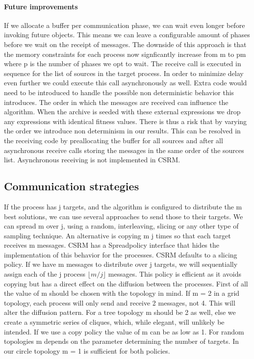 \paragraph{Future improvements}
If we allocate a buffer per communication phase, we can wait even longer before invoking future objects. This means we can leave a configurable amount of phases before we wait on the receipt of messages. The downside of this approach is that the memory constraints for each process now signficantly increase from m to pm where p is the number of phases we opt to wait.
The receive call is executed in sequence for the list of sources in the target process. In order to minimize delay even further we could execute this call asynchronously as well. Extra code would need to be introduced to handle the possible non deterministic behavior this introduces. The order in which the messages are received can influence the algorithm. When the archive is seeded with these external expressions we drop any expressions with identical fitness values. There is thus a risk that by varying the order we introduce non determinism in our results. This can be resolved in the receiving code by preallocating the buffer for all sources and after all asynchronous receive calls storing the messages in the same order of the sources list. 
Asynchronous receiving is not implemented in CSRM.
\subsection{Communication strategies}
If the process has j targets, and the algorithm is configured to distribute the m best solutions, we can use several approaches to send those to their targets. We can spread m over j, using a random, interleaving, slicing or any other type of sampling technique. An alternative is copying m j times so that each target receives m messages.
CSRM has a Spreadpolicy interface that hides the implementation of this behavior for the processes. CSRM defaults to a slicing policy. If we have m messages to distribute over j targets, we will sequentially assign each of the j process $ \lfloor{m/j}\rfloor $ messages.
This policy is efficient as it avoids copying but has a direct effect on the diffusion between the processes. First of all the value of m should be chosen with the topology in mind. If m = 2 in a grid topology, each process will only send and receive 2 messages, not 4. This will alter the diffusion pattern. For a tree topology m should be 2 as well, else we create a symmetric series of cliques, which, while elegant, will unlikely be intended. If we use a copy policy the value of m can be as low as 1. For random topologies m depends on the parameter determining the number of targets. In our circle topology m = 1 is sufficient for both policies.


